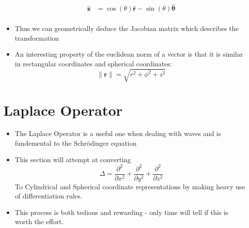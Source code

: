 \documentclass{article}
\begin{document}
\begin{itemize}
\begin{align}
            \hat{\mathbf{z}} & = \cos{(\theta)}\hat{\mathbf{r}}-\sin{(\theta)}\hat{\mathbf{\theta}}\\
        \end{align}
    \item Thus we can geometrically deduce the Jacobian matrix which describes the transformation
    \item An interesting property of the euclidean norm of a vector is that it is similar in rectangular coordinates and spherical coordinates:
        \begin{equation}
            \lVert \mathbf{r} \rVert = \sqrt{r^2+\phi^2+z^2}
        \end{equation}
\end{itemize}
\section{Laplace Operator}
\begin{itemize}
    \item The Laplace Operator is a useful one when dealing with waves and is fundemental to the Schrödinger equation
    \item This section will attempt at converting
        \begin{equation}
            \Delta = \frac{\partial^2}{\partial x^2}+ \frac{\partial^2}{\partial y^2}+ \frac{\partial^2}{\partial z^2}
        \end{equation}
        To Cylindrical and Spherical coordinate representations by making heavy use of differentiation rules.
    \item This process is both tedious and rewarding - only time will tell if this is worth the effort.
\end{itemize}
\end{document}
